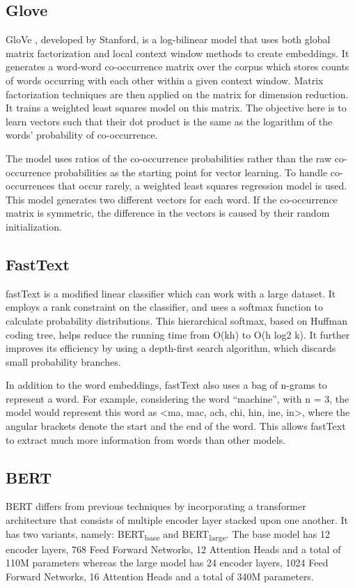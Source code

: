\documentclass[format=acmsmall,review=true,screen=true]{acmart}
\begin{document}
    \subsection{Glove}
    GloVe \cite{pennington2014glove}, developed by Stanford, is a log-bilinear model that uses both global matrix factorization and local context window methods to create embeddings. It generates a word-word co-occurrence matrix over the corpus which stores counts of words occurring with each other within a given context window. Matrix factorization techniques are then applied on the matrix for dimension reduction. It trains a weighted least squares model on this matrix. The objective here is to learn vectors such that their dot product is the same as the logarithm of the words' probability of co-occurrence.
    
    The model uses ratios of the co-occurrence probabilities rather than the raw co-occurrence probabilities as the starting point for vector learning. To handle co-occurrences that occur rarely, a weighted least squares regression model is used. This model generates two different vectors for each word. If the co-occurrence matrix is symmetric, the difference in the vectors is caused by their random initialization.
    \subsection{FastText}
    fastText \cite{arm2016bag} is a modified linear classifier which can work with a large dataset. It employs a rank constraint on the classifier, and uses a softmax function to calculate probability distributions. This hierarchical softmax, based on Huffman coding tree, helps reduce the running time from O(kh) to O(h log2 k). It further improves its efficiency by using a depth-first search algorithm, which discards small probability branches.
    
    In addition to the word embeddings, fastText also uses a bag of n-grams to represent a word. For example, considering the word “machine”, with n = 3, the model would represent this word as <ma, mac, ach, chi, hin, ine, in>, where the angular brackets denote the start and the end of the word. This allows fastText to extract much more information from words than other models. 
    \subsection{BERT}
    BERT differs from previous techniques by incorporating a transformer architecture that consists of multiple encoder layer stacked upon one another. It has two variants, namely: \texorpdfstring{BERT\textsubscript{base}}{} and \texorpdfstring{BERT\textsubscript{large}}{}. The base model has 12 encoder layers, 768 Feed Forward Networks, 12 Attention Heads and a total of 110M parameters whereas the large model has 24 encoder layers, 1024 Feed Forward Networks, 16 Attention Heads and a total of 340M parameters.\\
    
\end{document}
